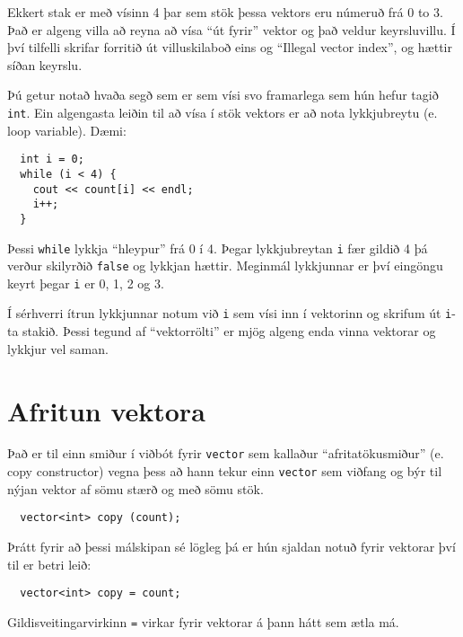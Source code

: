 \vspace{0.1in}
\centerline{}
\vspace{0.1in}

Ekkert stak er með vísinn 4 þar sem stök þessa vektors eru númeruð frá 0 to 3.
Það er algeng villa að reyna að vísa ``út fyrir'' vektor og það veldur keyrsluvillu.
Í því tilfelli skrifar forritið út villuskilaboð eins og ``Illegal vector index'', og hættir síðan keyrslu.


Þú getur notað hvaða segð sem er sem vísi svo framarlega sem hún hefur tagið {\tt int}.
Ein algengasta leiðin til að vísa í stök vektors er að nota lykkjubreytu (e. loop variable).
Dæmi:

\begin{verbatim}
  int i = 0;
  while (i < 4) {
    cout << count[i] << endl;
    i++;
  }
\end{verbatim}
%
Þessi {\tt while} lykkja ``hleypur'' frá 0 í 4.
Þegar lykkjubreytan {\tt i} fær gildið 4 þá verður skilyrðið {\tt false} og lykkjan hættir.
Meginmál lykkjunnar er því eingöngu keyrt þegar {\tt i} er 0, 1, 2 og 3.


Í sérhverri ítrun lykkjunnar notum við {\tt i} sem vísi inn í vektorinn og skrifum út {\tt i}-ta stakið.
Þessi tegund af ``vektorrölti'' er mjög algeng enda vinna vektorar og lykkjur vel saman.

\section{Afritun vektora}

Það er til einn smiður í viðbót fyrir {\tt vector} sem kallaður ``afritatökusmiður'' (e. copy constructor)
vegna þess að hann tekur einn {\tt vector} sem viðfang og býr til nýjan vektor af sömu stærð og með sömu stök.

\begin{verbatim}
  vector<int> copy (count);
\end{verbatim}
%
Þrátt fyrir að þessi málskipan sé lögleg þá er hún sjaldan notuð fyrir vektorar því til er betri leið:

\begin{verbatim}
  vector<int> copy = count;
\end{verbatim}
%
Gildisveitingarvirkinn {\tt =} virkar fyrir vektorar á þann hátt sem ætla má.


